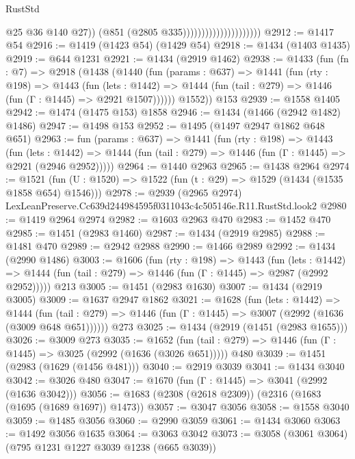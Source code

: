 \begin{lexlean}{RustStd}
\begin{coremodule}
                                              @25
                                              @36
                                              @140
                                              @27))
                                          (@851 (@2805 @335)))))))))))))))))))))
@2912 := @1417 @54
@2916 := @1419 (@1423 @54) (@1429 @54)
@2918 := @1434 (@1403 @1435)
@2919 := @644 @1231
@2921 := @1434 (@2919 @1462)
@2938 := @1433
    (fun (fn : @7) =>
    @2918
      (@1438
        (@1440
          (fun (params : @637) =>
          @1441
            (fun (rty : @198) =>
            @1443
              (fun (lets : @1442) =>
              @1444 (fun (tail : @279) => @1446 (fun (Γ : @1445) => @2921 @1507))))))
        @1552))
    @153
@2939 := @1558 @1405
@2942 := @1474 (@1475 @153) @1858
@2946 := @1434 (@1466 (@2942 @1482) @1486)
@2947 := @1498 @153
@2952 := @1495 (@1497 @2947 @1862 @648 @651)
@2963 := fun (params : @637) =>
  @1441
    (fun (rty : @198) =>
    @1443
      (fun (lets : @1442) =>
      @1444 (fun (tail : @279) => @1446 (fun (Γ : @1445) => @2921 (@2946 @2952)))))
@2964 := @1440 @2963
@2965 := @1438 @2964
@2974 := @1521 (fun (U : @1520) => @1522 (fun (t : @29) => @1529 (@1434 (@1535 @1858 @654) @1546)))
@2978 := @2939 (@2965 @2974) LexLeanPreserve.Cc639d244984595f0311043c4c505146e.R11.RustStd.look2
@2980 := @1419 @2964 @2974
@2982 := @1603 @2963 @470
@2983 := @1452 @470
@2985 := @1451 (@2983 @1460)
@2987 := @1434 (@2919 @2985)
@2988 := @1481 @470
@2989 := @2942 @2988
@2990 := @1466 @2989
@2992 := @1434 (@2990 @1486)
@3003 := @1606
    (fun (rty : @198) =>
    @1443
      (fun (lets : @1442) =>
      @1444 (fun (tail : @279) => @1446 (fun (Γ : @1445) => @2987 (@2992 @2952)))))
    @213
@3005 := @1451 (@2983 @1630)
@3007 := @1434 (@2919 @3005)
@3009 := @1637 @2947 @1862
@3021 := @1628
    (fun (lets : @1442) =>
    @1444 (fun (tail : @279) => @1446 (fun (Γ : @1445) => @3007 (@2992 (@1636 (@3009 @648 @651))))))
    @273
@3025 := @1434 (@2919 (@1451 (@2983 @1655)))
@3026 := @3009 @273
@3035 := @1652
    (fun (tail : @279) => @1446 (fun (Γ : @1445) => @3025 (@2992 (@1636 (@3026 @651)))))
    @480
@3039 := @1451 (@2983 (@1629 (@1456 @481)))
@3040 := @2919 @3039
@3041 := @1434 @3040
@3042 := @3026 @480
@3047 := @1670 (fun (Γ : @1445) => @3041 (@2992 (@1636 @3042)))
@3056 := @1683 (@2308 (@2618 @2309)) (@2316 (@1683 (@1695 (@1689 @1697)) @1473))
@3057 := @3047 @3056
@3058 := @1558 @3040
@3059 := @1485 @3056
@3060 := @2990 @3059
@3061 := @1434 @3060
@3063 := @1492 @3056 @1635
@3064 := @3063 @3042
@3073 := @3058 (@3061 @3064) (@795 @1231 @1227 @3039 @1238 (@665 @3039))

\end{coremodule}
\end{lexlean}
